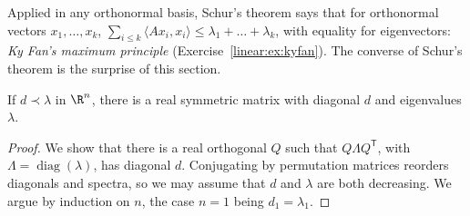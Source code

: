 Applied in any orthonormal basis, Schur's theorem says that for orthonormal vectors $x_1,\dots,x_k$,
$\sum_{i\le k}\langle Ax_i,x_i\rangle\le\lambda_1+\dots+\lambda_k$, with equality for eigenvectors: \emph{Ky Fan's maximum
principle} (Exercise~\ref{linear:ex:kyfan}). The converse of Schur's theorem is the surprise of this section.

\begin{theorem}[Horn, 1954]\label{linear:thm:horn}
If $d\prec\lambda$ in $\R^n$, there is a real symmetric matrix with diagonal $d$ and eigenvalues $\lambda$.
\end{theorem}
\begin{proof}
We show that there is a real orthogonal $Q$ such that $Q\Lambda Q^{\mathsf T}$, with $\Lambda=\operatorname{diag}(\lambda)$,
has diagonal $d$. Conjugating by permutation matrices reorders diagonals and spectra, so we may assume that $d$ and
$\lambda$ are both decreasing. We argue by induction on $n$, the case $n=1$ being $d_1=\lambda_1$.


\end{proof}

